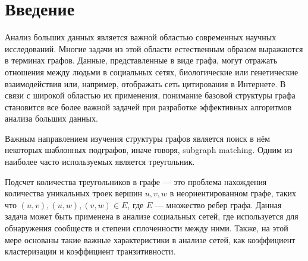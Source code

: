 \documentclass[14pt]{matmex-diploma}
\begin{document}
\maketitle
\tableofcontents
\section*{Введение}
Анализ больших данных является важной областью современных научных исследований. Многие задачи из этой области естественным образом выражаются в терминах графов. Данные, представленные в виде графа, могут отражать отношения между людьми в социальных сетях, биологические или генетические взаимодействия или, например, отображать сеть цитирования в Интернете. В связи с широкой областью их применения, понимание базовой структуры графа становится все более важной задачей при разработке эффективных алгоритмов анализа больших данных.

Важным направлением изучения структуры графов является поиск в нём некоторых шаблонных подграфов, иначе говоря, subgraph matching. Одним из наиболее часто используемых является треугольник.

Подсчет количества треугольников в графе --- это проблема нахождения количества уникальных троек вершин $u, v, w$ в неориентированном графе, таких что $(u, v), (u, w), (v, w) \in E$, где $E$ --- множество ребер графа. Данная задача может быть применена в анализе социальных сетей, где используется для обнаружения сообществ и степени сплоченности между ними. Также, на этой мере основаны такие важные характеристики в анализе сетей, как коэффициент кластеризации и коэффициент транзитивности.
\end{document}
